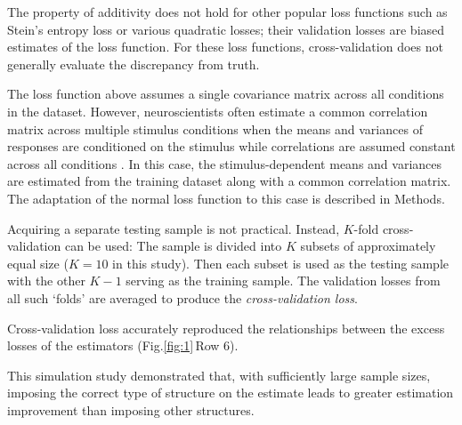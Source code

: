 \documentclass[10pt]{article}
\newcommand{\sq}[1]{\lq#1\rq}
\newcommand{\figref}[2]{Fig.\;\ref{fig:#1}\,#2}
\begin{document}
The property of additivity does not hold for other popular loss functions such as Stein's entropy loss or various quadratic losses; their validation losses are biased estimates of the loss function. For these loss functions, cross-validation does not generally evaluate the discrepancy from truth. 

The loss function above assumes a single covariance matrix across all conditions in the dataset.  However, neuroscientists often estimate a common correlation matrix across multiple stimulus conditions when the means and variances of responses are conditioned on the stimulus while correlations are assumed constant across all conditions \cite{Vogels:1989, Ponce:2013}. In this case, the stimulus-dependent means and variances are estimated from the training dataset along with a common correlation matrix. The adaptation of the normal loss function to this case is described in Methods.

Acquiring a separate testing sample is not practical. Instead, $K$-fold cross-validation can be used: The sample is divided into $K$ subsets of approximately equal size ($K=10$ in this study).  Then each subset is used as the testing sample with the other $K-1$ serving as the training sample. The validation losses from all such \sq{folds} are averaged to produce the \emph{cross-validation loss}.  

Cross-validation loss accurately reproduced the relationships between the excess losses of the estimators (\figref{1}{Row 6}). 

This simulation study demonstrated that, with sufficiently large sample sizes, imposing the correct type of structure on the estimate leads to greater estimation improvement than imposing other structures.
\end{document}
